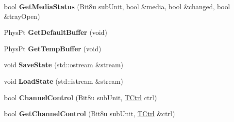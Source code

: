 \begin{DoxyCompactItemize}
\item 
\hypertarget{classCMscdex_abdd75d8019cc9190c34975e1c6e84b47}{bool {\bfseries Get\-Media\-Status} (Bit8u sub\-Unit, bool \&media, bool \&changed, bool \&tray\-Open)}\label{classCMscdex_abdd75d8019cc9190c34975e1c6e84b47}

\item 
\hypertarget{classCMscdex_a7a887c5c48a967fa8c3f1f429478e28f}{Phys\-Pt {\bfseries Get\-Default\-Buffer} (void)}\label{classCMscdex_a7a887c5c48a967fa8c3f1f429478e28f}

\item 
\hypertarget{classCMscdex_af32260380b7e357a0d77baaecbda6aef}{Phys\-Pt {\bfseries Get\-Temp\-Buffer} (void)}\label{classCMscdex_af32260380b7e357a0d77baaecbda6aef}

\item 
\hypertarget{classCMscdex_a9267374dbbd4c82f082cbfeb07ec7317}{void {\bfseries Save\-State} (std\-::ostream \&stream)}\label{classCMscdex_a9267374dbbd4c82f082cbfeb07ec7317}

\item 
\hypertarget{classCMscdex_a0cf511573055dc6f2f8d9669cca861e6}{void {\bfseries Load\-State} (std\-::istream \&stream)}\label{classCMscdex_a0cf511573055dc6f2f8d9669cca861e6}

\item 
\hypertarget{classCMscdex_a4c8cd11142b468ce00f7dbfe2e96830e}{bool {\bfseries Channel\-Control} (Bit8u sub\-Unit, \hyperlink{structSCtrl}{T\-Ctrl} ctrl)}\label{classCMscdex_a4c8cd11142b468ce00f7dbfe2e96830e}

\item 
\hypertarget{classCMscdex_a6facd9da08f3c1ccfa55094165b5dce1}{bool {\bfseries Get\-Channel\-Control} (Bit8u sub\-Unit, \hyperlink{structSCtrl}{T\-Ctrl} \&ctrl)}\label{classCMscdex_a6facd9da08f3c1ccfa55094165b5dce1}

\end{DoxyCompactItemize}
